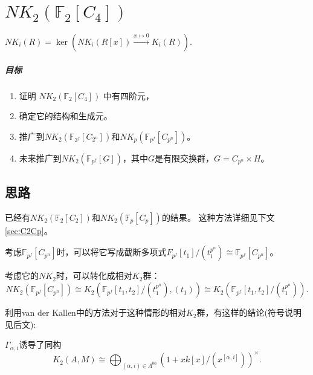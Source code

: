 \chapter{$NK_2(\mathbb{F}_2[C_4])$}

$NK_i(R)=\ker(NK_i(R[x])\overset{x\mapsto 0}\longrightarrow K_i(R)).$

\paragraph{目标} %
\label{par:目标}
\begin{enumerate}
	\item 证明 $NK_2(\mathbb{F}_2[C_4])$ 中有四阶元，
	\item 确定它的结构和生成元。
	\item 推广到$NK_2(\mathbb{F}_{2^f}[C_{2^n}])$和$NK_p(\mathbb{F}_{p^f}[C_{p^n}])$。
	\item 未来推广到$NK_2(\mathbb{F}_{p^f}[G])$，其中$G$是有限交换群，$G=C_{p^n} \times H$。
\end{enumerate}
































 
\section{思路}
已经有$NK_2(\mathbb{F}_2[C_2])$和$NK_2(\mathbb{F}_p[C_p])$的结果\cite{Guin-Waléry1981}。 这种方法详细见下文\ref{sec:C2Cp}。

考虑$\mathbb{F}_{p^f}[C_{p^n}]$时，可以将它{\color{blue}写成截断多项式${F}_{p^f}[t_1]/(t_1^{p^n})\cong \mathbb{F}_{p^f}[C_{p^n}]$}。

考虑它的$NK_2$时，可以{\color{blue}转化成相对$K_2$群}：
\[NK_2(\mathbb{F}_{p^f}[C_{p^n}]) \cong K_2(\mathbb{F}_{p^f}[t_1,t_2]/(t_1^{p^n}),(t_1))\cong K_2(\mathbb{F}_{p^f}[t_1,t_2]/(t_1^{p^n})).\]

利用van der Kallen\cite{MR86f:18017}中的方法对于这种情形的相对$K_2$群，有这样的结论(符号说明见后文):
\begin{theorem*}
	$\Gamma_{\alpha,i}$诱导了{\color{red}同构}
\[ K_2(A,M)\cong \bigoplus_{(\alpha,i)\in\Lambda^{00}}(1+xk[x]/(x^{[\alpha,i]}))^{\times}.\]
\end{theorem*}

